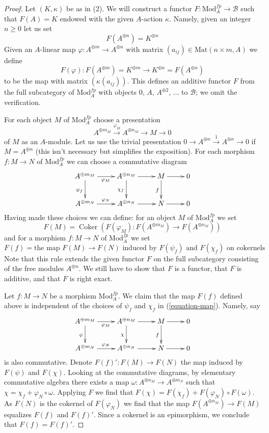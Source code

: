 \documentclass[10pt,a4paper]{amsart}
\theoremstyle{plain}
\theoremstyle{definition}
\theoremstyle{remark}
\numberwithin{equation}{subsection}
\def\Coker{\mathop{\mathrm{Coker}}}
\begin{document}
\begin{proof}
Let $(K, \kappa)$ be as in (2). We will construct a functor
$F : \text{Mod}^{fp}_A \to \mathcal{B}$ such that $F(A) = K$
endowed with the given $A$-action $\kappa$. Namely, given an
integer $n \geq 0$ let us set
$$
F(A^{\oplus n}) = K^{\oplus n}
$$
Given an $A$-linear map $\varphi : A^{\oplus m} \to A^{\oplus n}$
with matrix $(a_{ij}) \in \text{Mat}(n \times m, A)$ we define
$$
F(\varphi) :
F(A^{\oplus m}) = K^{\oplus m}
\longrightarrow
K^{\oplus n} = F(A^{\oplus n})
$$
to be the map with matrix $(\kappa(a_{ij}))$. This defines an additive
functor $F$ from the full subcategory of
$\text{Mod}^{fp}_A$ with objects $0$, $A$, $A^{\oplus 2}$, $\ldots$
to $\mathcal{B}$; we omit the verification.

\medskip\noindent
For each object $M$ of $\text{Mod}^{fp}_A$ choose a presentation
$$
A^{\oplus m_M} \xrightarrow{\varphi_M} A^{\oplus n_M} \to M \to 0
$$
of $M$ as an $A$-module. Let us use the trivial presentation
$0 \to A^{\oplus n} \xrightarrow{1} A^{\oplus n} \to 0$ if $M = A^{\oplus n}$
(this isn't necessary but simplifies the exposition).
For each morphism $f : M \to N$ of
$\text{Mod}^{fp}_A$ we can choose a commutative diagram
\begin{equation}
\label{equation-map}
\vcenter{
\xymatrix{
A^{\oplus m_M} \ar[r]_{\varphi_M} \ar[d]_{\psi_f} &
A^{\oplus n_M} \ar[r] \ar[d]_{\chi_f} &
M \ar[r] \ar[d]_f & 0 \\
A^{\oplus m_N} \ar[r]^{\varphi_N} &
A^{\oplus n_N} \ar[r] &
N \ar[r] & 0
}
}
\end{equation}
Having made these choices we can define: for an object
$M$ of $\text{Mod}^{fp}_A$ we set
$$
F(M) = \Coker(F(\varphi_M) : F(A^{\oplus m_M}) \to F(A^{\oplus n_M}))
$$
and for a morphism $f : M \to N$ of $\text{Mod}^{fp}_A$ we set
$$
F(f) = \text{the map }F(M) \to F(N)\text{ induced by }
F(\psi_f)\text{ and }F(\chi_f)\text{ on cokernels}
$$
Note that this rule extends the given functor $F$ on
the full subcategory consisting of the free modules $A^{\oplus n}$.
We still have to show that $F$ is a functor, that $F$ is additive,
and that $F$ is right exact.

\medskip\noindent
Let $f : M \to N$ be a morphism $\text{Mod}^{fp}_A$. We claim that the map
$F(f)$ defined above is independent of the choices of $\psi_f$ and $\chi_f$
in (\ref{equation-map}). Namely, say
$$
\xymatrix{
A^{\oplus m_M} \ar[r]_{\varphi_M} \ar[d]_\psi &
A^{\oplus n_M} \ar[r] \ar[d]_\chi &
M \ar[r] \ar[d]_f & 0 \\
A^{\oplus m_N} \ar[r]^{\varphi_N} &
A^{\oplus n_N} \ar[r] &
N \ar[r] & 0
}
$$
is also commutative. Denote $F(f)' : F(M) \to F(N)$ the map
induced by $F(\psi)$ and $F(\chi)$. Looking at the commutative
diagrams, by elementary commutative algebra there exists a map
$\omega : A^{\oplus n_M} \to A^{\oplus m_N}$ such that
$\chi = \chi_f + \varphi_N \circ \omega$. Applying $F$ we
find that $F(\chi) = F(\chi_f) + F(\varphi_N) \circ F(\omega)$.
As $F(N)$ is the cokernel of $F(\varphi_N)$ we find
that the map $F(A^{\oplus n_M}) \to F(M)$ equalizes $F(f)$ and $F(f)'$.
Since a cokernel is an epimorphism, we conclude that $F(f) = F(f)'$.


\end{proof}
\end{document}
